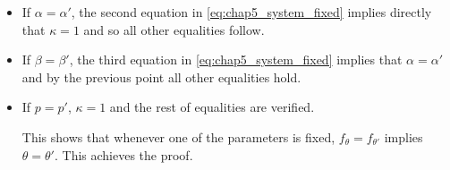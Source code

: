 \begin{subappendices}
\begin{itemize}
        \item If $\alpha = \alpha'$, the second equation in \eqref{eq:chap5_system_fixed} implies directly that $\kappa=1$ and so all other equalities follow.
        \item If $\beta = \beta'$, the third equation in \eqref{eq:chap5_system_fixed} implies that $\alpha=\alpha'$ and by the previous point all other equalities hold.
        \item If $p = p'$, $\kappa=1$ and the rest of equalities are verified.
        
        This shows that whenever one of the parameters is fixed, $f_\theta = f_{\theta'}$ implies $\theta = \theta'$. This achieves the proof.

    \end{itemize}



\end{subappendices}